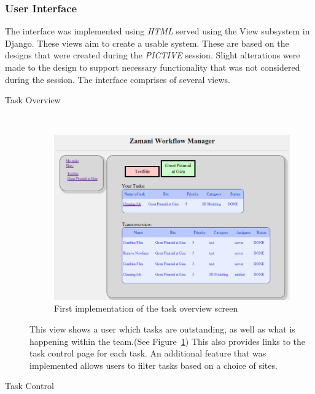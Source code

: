 \subsubsection{User Interface}
The interface was implemented using \emph{HTML} served using the View subsystem in Django.
These views aim to create a usable system. These are based on the designs that were created
during the \emph{PICTIVE} session. Slight alterations were made to the design to support
necessary functionality that was not considered during the session. The interface comprises of several
views.
\begin{description}
\item[Task Overview] \hfill \\
    \begin{figure}[!h]
        \begin{center}
            \includegraphics[scale=0.4]{figures/task_overview_impl2.png}
        \end{center}
        \caption{First implementation of the task overview screen}
        \label{task_overview_impl2}
    \end{figure}
    This view shows a user which tasks are outstanding, as well as what is
    happening within the team.(See Figure~\ref{task_overview_impl2}) This also provides links to the task control page for each task.
    An additional feature that was implemented allows users to filter tasks based on a choice
    of sites.
\item[Task Control] \hfill \\
    \begin{figure}[!h]
        \begin{center}

\end{center}
\end{figure}
\end{description}
